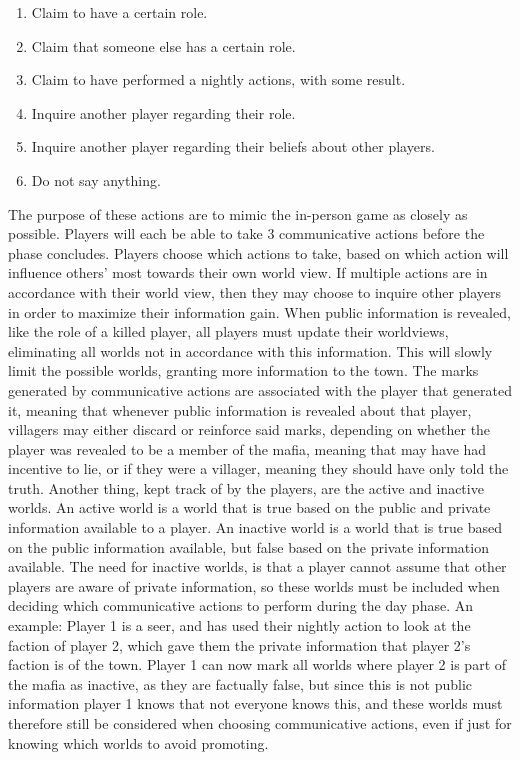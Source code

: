 \begin{enumerate}
    \item Claim to have a certain role.
    \item Claim that someone else has a certain role.
    \item Claim to have performed a nightly actions, with some result.
    \item Inquire another player regarding their role.
    \item Inquire another player regarding their beliefs about other players.
    \item Do not say anything.
\end{enumerate}
The purpose of these actions are to mimic the in-person game as closely as
possible. Players will each be able to take 3 communicative actions before the
phase concludes. Players choose which actions to take, based on which action
will influence others’ most towards their own world view. If multiple actions
are in accordance with their world view, then they may choose to inquire other
players in order to maximize their information gain. When public information is
revealed, like the role of a killed player, all players must update their
worldviews, eliminating all worlds not in accordance with this information.
This will slowly limit the possible worlds, granting more information to the
town. The marks generated by communicative actions are associated with the
player that generated it, meaning that whenever public information is revealed
about that player, villagers may either discard or reinforce said marks,
depending on whether the player was revealed to be a member of the mafia,
meaning that may have had incentive to lie, or if they were a villager, meaning
they should have only told the truth. Another thing, kept track of by the
players, are the active and inactive worlds. An active world is a world that is
true based on the public and private information available to a player. An
inactive world is a world that is true based on the public information
available, but false based on the private information available. The need for
inactive worlds, is that a player cannot assume that other players are aware of
private information, so these worlds must be included when deciding which
communicative actions to perform during the day phase. An example: Player 1 is
a seer, and has used their nightly action to look at the faction of player 2,
which gave them the private information that player 2's faction is of the town.
Player 1 can now mark all worlds where player 2 is part of the mafia as
inactive, as they are factually false, but since this is not public information
player 1 knows that not everyone knows this, and these worlds must therefore
still be considered when choosing communicative actions, even if just for
knowing which worlds to avoid promoting.
